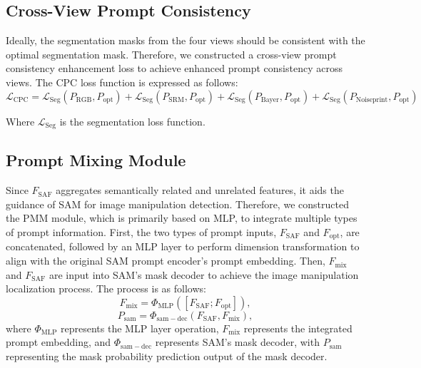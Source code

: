 \subsection{Cross-View Prompt Consistency}
Ideally, the segmentation masks from the four views should be consistent with the optimal segmentation mask. Therefore, we constructed a cross-view prompt consistency enhancement loss to achieve enhanced prompt consistency across views. The $\mathrm{CPC}$ loss function is expressed as follows:
\begin{equation}
\mathcal{L}_{\mathrm{CPC}} = \mathcal{L}_{\mathrm{Seg}}(P_{\mathrm{RGB}}, P_{\text{opt}}) + \mathcal{L}_{\mathrm{Seg}}(P_{\mathrm{SRM}}, P_{\text{opt}}) + \mathcal{L}_{\mathrm{Seg}}(P_{\mathrm{Bayer}}, P_{\text{opt}}) +
\mathcal{L}_{\mathrm{Seg}}(P_{\mathrm{Noiseprint}}, P_{\text{opt}})
\end{equation}

Where $\mathcal{L}_{\mathrm{Seg}}$ is the segmentation loss function.

\subsection{Prompt Mixing Module}
Since $F_{\mathrm{SAF}}$ aggregates semantically related and unrelated features, it aids the guidance of SAM for image manipulation detection. Therefore, we constructed the PMM module, which is primarily based on MLP, to integrate multiple types of prompt information. First, the two types of prompt inputs, $F_{\mathrm{SAF}}$ and $F_{\mathrm{opt}}$, are concatenated, followed by an MLP layer to perform dimension transformation to align with the original SAM prompt encoder's prompt embedding. Then, $F_{\mathrm{mix}}$ and $F_{\mathrm{SAF}}$ are input into SAM's mask decoder to achieve the image manipulation localization process. The process is as follows:
\begin{equation}
F_{\mathrm{mix}} = \Phi_{\mathrm{MLP}}\left([F_{\mathrm{SAF}} ; F_{\mathrm{opt}}]\right),
\end{equation}
\begin{equation}
P_{\mathrm{sam}} = \Phi_{\mathrm{sam-dec}}(F_{\mathrm{SAF}}, F_{\mathrm{mix}}),
\end{equation}
where $\Phi_{\mathrm{MLP}}$ represents the MLP layer operation, $F_{\mathrm{mix}}$ represents the integrated prompt embedding, and $\Phi_{\mathrm{sam-dec}}$ represents SAM's mask decoder, with $P_{\mathrm{sam}}$ representing the mask probability prediction output of the mask decoder.

